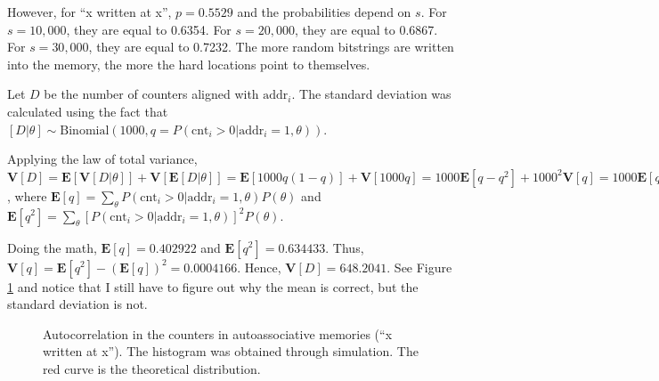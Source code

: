 However, for ``x written at x'', $p=0.5529$ and the probabilities depend on $s$. For $s=10,000$, they are equal to 0.6354. For $s=20,000$, they are equal to 0.6867. For $s=30,000$, they are equal to 0.7232. The more random bitstrings are written into the memory, the more the hard locations point to themselves.

Let $D$ be the number of counters aligned with $\text{addr}_i$. The standard deviation was calculated using the fact that $[D|\theta] \sim \text{Binomial}(1000, q=P(\text{cnt}_i > 0 | \text{addr}_i=1, \theta))$.

Applying the law of total variance, $\mathbf{V}[D] = \mathbf{E}[\mathbf{V}[D|\theta]] + \mathbf{V}[\mathbf{E}[D|\theta]] = \mathbf{E}[1000 q (1-q)] + \mathbf{V}[1000 q] = 1000 \mathbf{E}[q-q^2] + 1000^2 \mathbf{V}[q] = 1000 \mathbf{E}[q](1-\mathbf{E}[q]) + 1000(1000-1)\mathbf{V}[q]$, where $\mathbf{E}[q] = \sum_\theta P(\text{cnt}_i > 0 | \text{addr}_i=1, \theta) P(\theta)$ and $\mathbf{E}[q^2] = \sum_\theta [P(\text{cnt}_i > 0 | \text{addr}_i=1, \theta)]^2 P(\theta)$.

Doing the math, $\mathbf{E}[q] = 0.402922$ and $\mathbf{E}[q^2] = 0.634433$. Thus, $\mathbf{V}[q] = \mathbf{E}[q^2] - (\mathbf{E}[q])^2 = 0.0004166$. Hence, $\mathbf{V}[D] = 648.2041$. See Figure \ref{fig:sdm-corr-prob} and notice that I still have to figure out why the mean is correct, but the standard deviation is not.

\begin{figure}[h!]
  \centering


  \caption{Autocorrelation in the counters in autoassociative memories (``x written at x''). The histogram was obtained through simulation. The red curve is the theoretical distribution.}
  \label{fig:sdm-corr-prob}
\end{figure}



